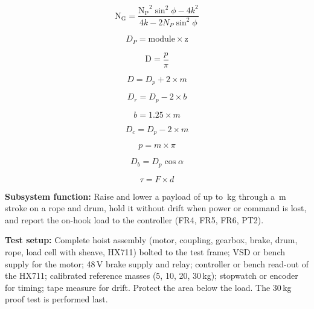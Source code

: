 \begin{equation}
\label{eq:max_gear}
\mathrm{N_G} = \frac{\mathrm{N_P}^2 \sin^2 \phi - 4k^2}{4k - 2N_P \sin^2 \phi}
\end{equation}

\begin{equation}
\label{eq:pitch_circle}
D_P = \mathrm{module} \times \mathrm{z}
\end{equation}

\begin{equation}
\label{eq:gear_module}
\mathrm{D} = \frac{p}{\pi}
\end{equation}


\begin{equation}
\label{eq:addendum_circle}
D = D_p + 2 \times m
\end{equation}


\begin{equation}
\label{eq:root_circle}
D_r = D_p - 2 \times b
\end{equation}


\begin{equation}
\label{eq:dedendum}
b = 1.25 \times m
\end{equation}

\begin{equation}
\label{eq:clearance_circle}
D_c = D_p - 2\times m
\end{equation}


\begin{equation}
\label{eq:circular_pitch}
p = m\times\pi
\end{equation}

\begin{equation}
\label{eq:base_circle}
D_b = D_p \cos{\alpha}
\end{equation}

\begin{equation}
    \label{eq:rig_torque}
    \tau = F \times d
\end{equation}

\textbf{Subsystem function:} Raise and lower a payload of up to \InMassRated\,kg through
a \InStroke\,m stroke on a rope and drum, hold it without drift when power or command is
lost, and report the on-hook load to the controller (FR4, FR5, FR6, PT2).
 
\textbf{Test setup:} Complete hoist assembly (motor, coupling, gearbox, brake, drum, rope,
load cell with sheave, HX711) bolted to the test frame; VSD or bench supply for the motor;
48\,V brake supply and relay; controller or bench read-out of the HX711; calibrated
reference masses (5, 10, 20, 30\,kg); stopwatch or encoder for timing; tape measure for drift.
Protect the area below the load. The 30\,kg proof test is performed last.
 
